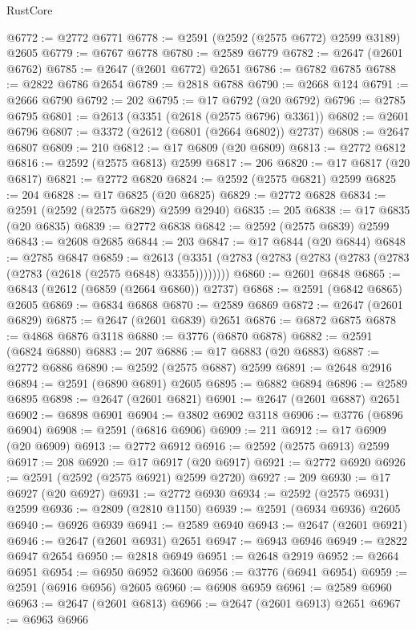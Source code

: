 \begin{lexlean}{RustCore}
\begin{coremodule}
@6772 := @2772 @6771
@6778 := @2591 (@2592 (@2575 @6772) @2599 @3189) @2605
@6779 := @6767 @6778
@6780 := @2589 @6779
@6782 := @2647 (@2601 @6762)
@6785 := @2647 (@2601 @6772) @2651
@6786 := @6782 @6785
@6788 := @2822 @6786 @2654
@6789 := @2818 @6788
@6790 := @2668 @124
@6791 := @2666 @6790
@6792 := 202
@6795 := @17 @6792 (@20 @6792)
@6796 := @2785 @6795
@6801 := @2613 (@3351 (@2618 (@2575 @6796) @3361))
@6802 := @2601 @6796
@6807 := @3372 (@2612 (@6801 (@2664 @6802)) @2737)
@6808 := @2647 @6807
@6809 := 210
@6812 := @17 @6809 (@20 @6809)
@6813 := @2772 @6812
@6816 := @2592 (@2575 @6813) @2599
@6817 := 206
@6820 := @17 @6817 (@20 @6817)
@6821 := @2772 @6820
@6824 := @2592 (@2575 @6821) @2599
@6825 := 204
@6828 := @17 @6825 (@20 @6825)
@6829 := @2772 @6828
@6834 := @2591 (@2592 (@2575 @6829) @2599 @2940)
@6835 := 205
@6838 := @17 @6835 (@20 @6835)
@6839 := @2772 @6838
@6842 := @2592 (@2575 @6839) @2599
@6843 := @2608 @2685
@6844 := 203
@6847 := @17 @6844 (@20 @6844)
@6848 := @2785 @6847
@6859 := @2613 (@3351 (@2783 (@2783 (@2783 (@2783 (@2783 (@2783 (@2618 (@2575 @6848) @3355))))))))
@6860 := @2601 @6848
@6865 := @6843 (@2612 (@6859 (@2664 @6860)) @2737)
@6868 := @2591 (@6842 @6865) @2605
@6869 := @6834 @6868
@6870 := @2589 @6869
@6872 := @2647 (@2601 @6829)
@6875 := @2647 (@2601 @6839) @2651
@6876 := @6872 @6875
@6878 := @4868 @6876 @3118
@6880 := @3776 (@6870 @6878)
@6882 := @2591 (@6824 @6880)
@6883 := 207
@6886 := @17 @6883 (@20 @6883)
@6887 := @2772 @6886
@6890 := @2592 (@2575 @6887) @2599
@6891 := @2648 @2916
@6894 := @2591 (@6890 @6891) @2605
@6895 := @6882 @6894
@6896 := @2589 @6895
@6898 := @2647 (@2601 @6821)
@6901 := @2647 (@2601 @6887) @2651
@6902 := @6898 @6901
@6904 := @3802 @6902 @3118
@6906 := @3776 (@6896 @6904)
@6908 := @2591 (@6816 @6906)
@6909 := 211
@6912 := @17 @6909 (@20 @6909)
@6913 := @2772 @6912
@6916 := @2592 (@2575 @6913) @2599
@6917 := 208
@6920 := @17 @6917 (@20 @6917)
@6921 := @2772 @6920
@6926 := @2591 (@2592 (@2575 @6921) @2599 @2720)
@6927 := 209
@6930 := @17 @6927 (@20 @6927)
@6931 := @2772 @6930
@6934 := @2592 (@2575 @6931) @2599
@6936 := @2809 (@2810 @1150)
@6939 := @2591 (@6934 @6936) @2605
@6940 := @6926 @6939
@6941 := @2589 @6940
@6943 := @2647 (@2601 @6921)
@6946 := @2647 (@2601 @6931) @2651
@6947 := @6943 @6946
@6949 := @2822 @6947 @2654
@6950 := @2818 @6949
@6951 := @2648 @2919
@6952 := @2664 @6951
@6954 := @6950 @6952 @3600
@6956 := @3776 (@6941 @6954)
@6959 := @2591 (@6916 @6956) @2605
@6960 := @6908 @6959
@6961 := @2589 @6960
@6963 := @2647 (@2601 @6813)
@6966 := @2647 (@2601 @6913) @2651
@6967 := @6963 @6966

\end{coremodule}
\end{lexlean}
